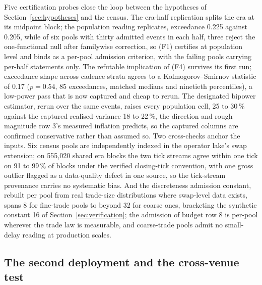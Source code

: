 \documentclass[11pt,a4paper]{article}
\theoremstyle{definition}
\theoremstyle{plain}
\theoremstyle{remark}
\begin{document}
Five certification probes close the loop between the hypotheses of Section~\ref{sec:hypotheses} and the census. The era-half replication splits the era at its midpoint block; the population 
reading replicates, exceedance 0.225 against 0.205, while of six pools with thirty admitted events in each half, three reject the one-functional null after familywise correction, so (F1) 
certifies at population level and binds as a per-pool admission criterion, with the failing pools carrying per-half statements only. The refutable implication of (F4) survives its first run; 
exceedance shape across cadence strata agrees to a Kolmogorov--Smirnov statistic of 0.17 ($p = 0.54$, 85 exceedances, matched medians and ninetieth percentiles), a low-power pass that is now 
captured and cheap to rerun. The designated bipower estimator, rerun over the same events, raises every population cell, 25 to 30\,\% against the captured realised-variance 18 to 22\,\%, the direction 
and rough magnitude row 3's measured inflation predicts, so the captured columns are confirmed conservative rather than assumed so. Two cross-checks anchor the inputs. Six census pools are 
independently indexed in the operator lake's swap extension; on 555{,}020 shared era blocks the two tick streams agree within one tick on 91 to 99\,\% of blocks under the verified closing-tick 
convention, with one gross outlier flagged as a data-quality defect in one source, so the tick-stream provenance carries no systematic bias. And the discreteness admission constant, rebuilt 
per pool from real trade-size distributions where swap-level data exists, spans 8 for fine-trade pools to beyond 32 for coarse ones, bracketing the synthetic constant 16 of Section~\ref{sec:verification}; 
the admission of budget row 8 is per-pool wherever the trade law is measurable, and coarse-trade pools admit no small-delay reading at production scales.

\subsection{The second deployment and the cross-venue test}\label{sec:crossvenue}
\end{document}
